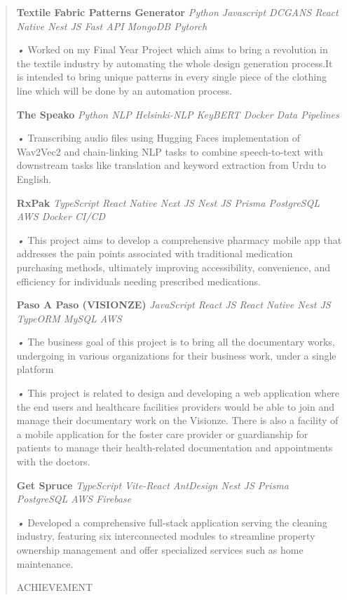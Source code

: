 \documentclass[
]{article}
\begin{document}
\begin{quote}
\textbf{Textile Fabric Patterns Generator} \emph{\textbar{} Python
Javascript DCGANS React Native Nest JS Fast API MongoDB Pytorch}

\emph{•} Worked on my Final Year Project which aims to bring a
revolution in the textile industry by automating the whole design
generation process.It is intended to bring unique patterns in every
single piece of the clothing line which will be done by an automation
process.

\textbf{The Speako} \emph{\textbar{} Python NLP Helsinki-NLP KeyBERT
Docker Data Pipelines}

\emph{•} Transcribing audio files using Hugging Faces implementation of
Wav2Vec2 and chain-linking NLP tasks to combine speech-to-text with
downstream tasks like translation and keyword extraction from Urdu to
English.

\textbf{RxPak} \emph{\textbar{} TypeScript React Native Next JS Nest JS
Prisma PostgreSQL AWS Docker CI/CD}

\emph{•} This project aims to develop a comprehensive pharmacy mobile
app that addresses the pain points associated with traditional
medication purchasing methods, ultimately improving accessibility,
convenience, and efficiency for individuals needing prescribed
medications.

\textbf{Paso A Paso (VISIONZE)} \emph{\textbar{} JavaScript React JS
React Native Nest JS TypeORM MySQL AWS}

\emph{•} The business goal of this project is to bring all the
documentary works, undergoing in various organizations for their
business work, under a single platform

\emph{•} This project is related to design and developing a web
application where the end users and healthcare facilities providers
would be able to join and manage their documentary work on the Visionze.
There is also a facility of a mobile application for the foster care
provider or guardianship for patients to manage their health-related
documentation and appointments with the doctors.

\textbf{Get Spruce} \emph{\textbar{} TypeScript Vite-React AntDesign
Nest JS Prisma PostgreSQL AWS Firebase}

\emph{•} Developed a comprehensive full-stack application serving the
cleaning industry, featuring six interconnected modules to streamline
property ownership management and offer specialized services such as
home maintenance.

ACHIEVEMENT
\end{quote}
\end{document}
